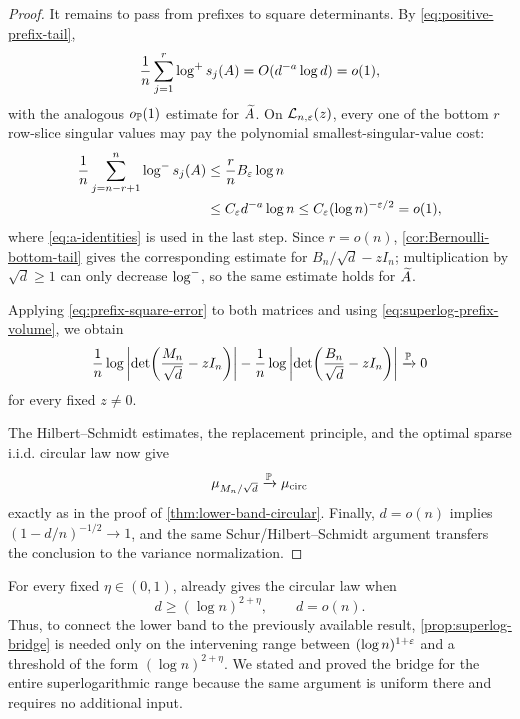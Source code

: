 \begin{proof}
It remains to pass from prefixes to square determinants. By \eqref{eq:positive-prefix-tail},
\begin{equation}\label{eq:superlog-positive-tail}
  \frac1n\sum_{j=1}^r\log^{+} s_j(A)
  =O(d^{-a}\log d)=o(1),
\end{equation}
with the analogous $o_{\mathbb P}(1)$ estimate for $\widetilde A$. On $\mathcal L_{n,\varepsilon}(z)$, every one of the bottom $r$ row-slice singular values may pay the polynomial smallest-singular-value cost:
\begin{align}
  \frac1n\sum_{j=n-r+1}^n\log^{-} s_j(A)
  &\le\frac rn B_\varepsilon\log n
  \notag\\
  &\le C_\varepsilon d^{-a}\log n
  \le C_\varepsilon(\log n)^{-\varepsilon/2}=o(1),
  \label{eq:superlog-row-bottom-tail}
\end{align}
where \eqref{eq:a-identities} is used in the last step. Since $r=o(n)$, \cref{cor:Bernoulli-bottom-tail} gives the corresponding estimate for $B_n/\sqrt d-zI_n$; multiplication by $\sqrt d\ge1$ can only decrease $\log^{-}$, so the same estimate holds for $\widetilde A$.

Applying \eqref{eq:prefix-square-error} to both matrices and using \eqref{eq:superlog-prefix-volume}, we obtain
\begin{equation}\label{eq:superlog-det-comparison}
  \frac1n\log\left|\det\!\left(\frac{M_n}{\sqrt d}-zI_n\right)\right|
  -\frac1n\log\left|\det\!\left(\frac{B_n}{\sqrt d}-zI_n\right)\right|
  \xrightarrow{\mathbb P}0
\end{equation}
for every fixed $z\ne0$.

The Hilbert--Schmidt estimates, the replacement principle, and the optimal sparse i.i.d. circular law now give
\[
  \mu_{M_n/\sqrt d}\xrightarrow{\mathbb P}\mu_{\mathrm{circ}}
\]
exactly as in the proof of \cref{thm:lower-band-circular}. Finally, $d=o(n)$ implies $(1-d/n)^{-1/2}\to1$, and the same Schur/Hilbert--Schmidt argument transfers the conclusion to the variance normalization.
\end{proof}

\begin{remark}
For every fixed $\eta\in(0,1)$, \cite[Theorem~1.3]{LLY26a} already gives the circular law when
\[
  d\ge(\log n)^{2+\eta},
  \qquad
  d=o(n).
\]
Thus, to connect the lower band to the previously available result, \cref{prop:superlog-bridge} is needed only on the intervening range between $(\log n)^{1+\varepsilon}$ and a threshold of the form $(\log n)^{2+\eta}$. We stated and proved the bridge for the entire superlogarithmic range because the same argument is uniform there and requires no additional input.
\end{remark}


